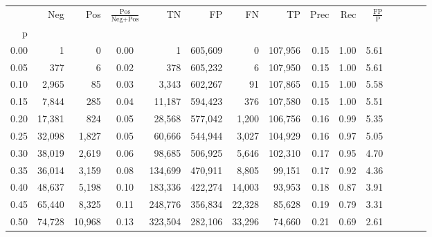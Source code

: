 \begin{tabular}{rrrcrrrrrrrrrrr}
\toprule
{} &     Neg &     Pos & $\frac{\text{Pos}}{\text{Neg}+\text{Pos}}$ &       TN &       FP &       FN &       TP &  Prec &   Rec & $\frac{\text{FP}}{\text{P}}$ \\
p    &         &         &                                            &          &          &          &          &       &       &                              \\
\midrule
0.00 &       1 &       0 &                                       0.00 &        1 &  605,609 &        0 &  107,956 &  0.15 &  1.00 &                         5.61 \\
0.05 &     377 &       6 &                                       0.02 &      378 &  605,232 &        6 &  107,950 &  0.15 &  1.00 &                         5.61 \\
0.10 &   2,965 &      85 &                                       0.03 &    3,343 &  602,267 &       91 &  107,865 &  0.15 &  1.00 &                         5.58 \\
0.15 &   7,844 &     285 &                                       0.04 &   11,187 &  594,423 &      376 &  107,580 &  0.15 &  1.00 &                         5.51 \\
0.20 &  17,381 &     824 &                                       0.05 &   28,568 &  577,042 &    1,200 &  106,756 &  0.16 &  0.99 &                         5.35 \\
0.25 &  32,098 &   1,827 &                                       0.05 &   60,666 &  544,944 &    3,027 &  104,929 &  0.16 &  0.97 &                         5.05 \\
0.30 &  38,019 &   2,619 &                                       0.06 &   98,685 &  506,925 &    5,646 &  102,310 &  0.17 &  0.95 &                         4.70 \\
0.35 &  36,014 &   3,159 &                                       0.08 &  134,699 &  470,911 &    8,805 &   99,151 &  0.17 &  0.92 &                         4.36 \\
0.40 &  48,637 &   5,198 &                                       0.10 &  183,336 &  422,274 &   14,003 &   93,953 &  0.18 &  0.87 &                         3.91 \\
0.45 &  65,440 &   8,325 &                                       0.11 &  248,776 &  356,834 &   22,328 &   85,628 &  0.19 &  0.79 &                         3.31 \\
0.50 &  74,728 &  10,968 &                                       0.13 &  323,504 &  282,106 &   33,296 &   74,660 &  0.21 &  0.69 &                         2.61 \\

\end{tabular}
